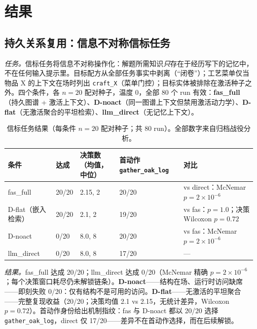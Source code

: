 \documentclass[10pt,a4paper]{ctexart}
\begin{document}
\section{结果}
\label{sec:results}

\subsection{持久关系复用：信息不对称信标任务}
\label{sec:res-reuse}

\emph{任务。}信标任务将信息不对称操作化：解题所需知识\emph{只}存在于经历写下的记忆中，不在任何输入提示里。目标配方从全部任务事实中剥离（“闭卷”）；工艺菜单仅当物品 X 的上下文在场时列出 \texttt{craft\_X}（菜单门控）；目标实体被排除在激活种子之外。四个条件，各 $n{=}20$ 配对种子，温度 0，全部 80 个 run 有效：\textbf{fas\_full}（持久图谱 + 激活上下文）、\textbf{D-noact}（同一图谱上下文但禁用激活动力学）、\textbf{D-flat}（无激活聚合的平坦检索）、\textbf{llm\_direct}（无记忆上下文）。

\begin{table}[t]
\centering\small
\caption{信标任务结果（每条件 $n{=}20$ 配对种子；共 80 run）。全部数字来自归档战役分析。}
\label{tab:beacon}
\begin{tabular}{L{2.6cm}L{2.2cm}L{3.4cm}L{3.4cm}L{2.6cm}}
\toprule
\textbf{条件} & \textbf{达成} & \textbf{决策数（均值，中位）} & \textbf{首动作 \texttt{gather\_oak\_log}} & \textbf{对比} \\
\midrule
fas\_full & 20/20 & 2.15, 2 & 20/20 & vs direct：McNemar $p{=}2\times10^{-6}$ \\
D-flat（嵌入检索） & 20/20 & 2.1, 2 & 19/20 & vs fas：$p{=}1.0$；决策 Wilcoxon $p{=}0.72$ \\
D-noact & 0/20 & 8.0, 8 & 20/20 & vs fas：McNemar $p{=}2\times10^{-6}$ \\
llm\_direct & 0/20 & 8.0, 8 & 17/20 & --- \\
\bottomrule
\end{tabular}
\end{table}

\emph{结果。}fas\_full 达成 20/20；llm\_direct 达成 0/20（McNemar 精确 $p{=}2\times10^{-6}$；每个决策窗口耗尽仍未解锁链条）。\textbf{D-noact}——结构在场、运行时访问缺席——即刻失败 0/20：仅有结构不是可用的访问。\textbf{D-flat}——无激活的平坦聚合——完整复现收益（20/20；决策均值 2.1 vs 2.15，无统计差异，Wilcoxon $p{=}0.72$）。首动作身份给出机制指纹：fas 与 D-noact 都以 20/20 选择 \texttt{gather\_oak\_log}，direct 仅 17/20——差异不在首动作选择，而在后续解锁。
\end{document}
